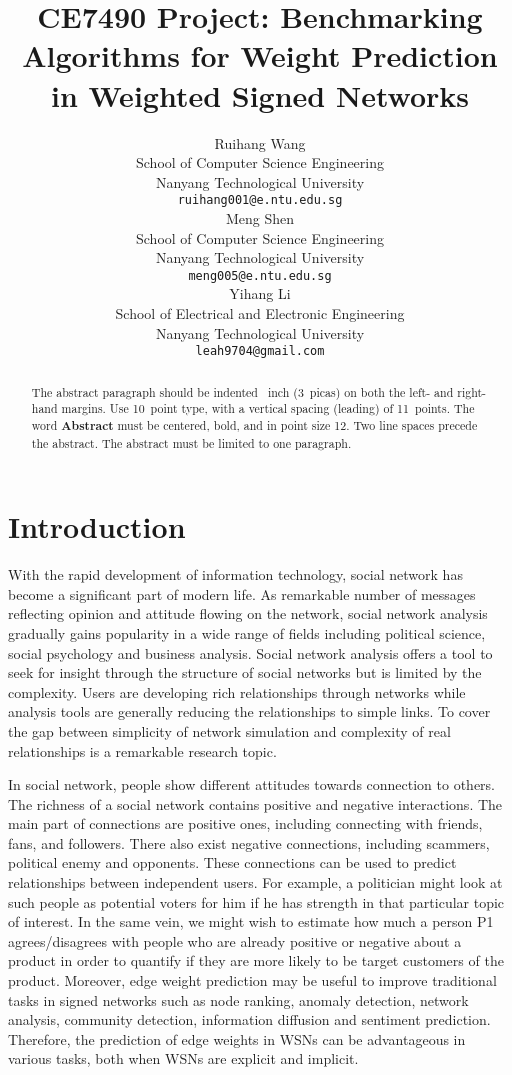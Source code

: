 \documentclass{article}
\title{CE7490 Project: Benchmarking Algorithms for Weight Prediction in Weighted Signed Networks}
\author{%
  Ruihang Wang\\
  School of Computer Science Engineering\\
  Nanyang Technological University\\
  \texttt{ruihang001@e.ntu.edu.sg} \\
  \And
  Meng Shen\\
  School of Computer Science Engineering\\
  Nanyang Technological University\\
  \texttt{meng005@e.ntu.edu.sg} \\
  \And
  Yihang Li\\
  School of Electrical and Electronic Engineering\\
  Nanyang Technological University\\
  \texttt{leah9704@gmail.com} \\
}
\begin{document}
\maketitle

\begin{abstract}
  The abstract paragraph should be indented ~inch (3~picas) on
  both the left- and right-hand margins. Use 10~point type, with a vertical
  spacing (leading) of 11~points.  The word \textbf{Abstract} must be centered,
  bold, and in point size 12. Two line spaces precede the abstract. The abstract
  must be limited to one paragraph.
\end{abstract}

\section{Introduction}

With the rapid development of information technology, social network has become a significant part of modern life. As remarkable number of messages reflecting opinion and attitude flowing on the network, social network analysis gradually gains popularity in a wide range of fields including political science, social psychology and business analysis. Social network analysis offers a tool to seek for insight through the structure of social networks but is limited by the complexity. Users are developing rich relationships through networks while analysis tools are generally reducing the relationships to simple links. To cover the gap between simplicity of network simulation and complexity of real relationships is a remarkable research topic. 

In social network, people show different attitudes towards connection to others. The richness of a social network contains positive and negative interactions. The main part of connections are positive ones, including connecting with friends, fans, and followers. There also exist negative connections, including scammers, political enemy and opponents. These connections can be used to predict relationships between independent users. For example, a politician might look at such people as potential voters for him if he has strength in that particular topic of interest. In the same vein, we might wish to estimate how much a person P1 agrees/disagrees with people who are already positive or negative about a product in order to quantify if they are more likely to be target customers of the product. Moreover, edge weight prediction may be useful to improve traditional tasks in signed networks such as node ranking\cite{shahriari2014ranking}, anomaly detection\cite{Kmumar2014}\cite{Wu:2016:TMR:2835776.2835816}, network analysis\cite{Kumar:2016:SDS:2872518.2889391}\cite{leskovec2010signed}, community detection\cite{PhysRevE.80.036115}, information diffusion\cite{Shafaei_2014} \cite{Li2014} and sentiment prediction\cite{west2014}. Therefore, the prediction of edge weights in WSNs can be advantageous in various tasks, both when WSNs are explicit and implicit.
\end{document}
